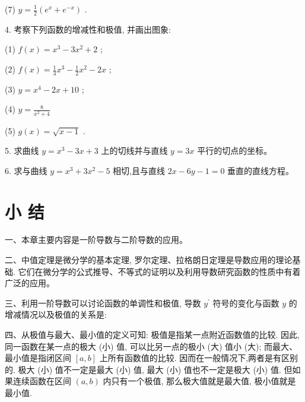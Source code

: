 \documentclass[10pt]{article}
\begin{document}
(7) \(y = \frac{1}{2}\left( {{e}^{x} + {e}^{-x}}\right)\) .

4. 考察下列函数的增减性和极值, 并画出图象:

(1) \(f\left( x\right) = {x}^{3} - 3{x}^{2} + 2\) ;

(2) \(f\left( x\right) = \frac{1}{3}{x}^{3} - \frac{1}{2}{x}^{2} - {2x}\) ;

(3) \(y = {x}^{4} - {2x} + {10}\) ;

(4) \(y = \frac{8}{{x}^{2} + 4}\)

(5) \(g\left( x\right) = \sqrt{x - 1}\) .

5. 求曲线 \(y = {x}^{3} - {3x} + 3\) 上的切线并与直线 \(y = {3x}\) 平行的切点的坐标。

6. 求与曲线 \(y = {x}^{3} + 3{x}^{2} - 5\) 相切,且与直线 \({2x} - {6y} - 1 = 0\) 垂直的直线方程。

\section*{小 结}

一、本章主要内容是一阶导数与二阶导数的应用。

二、中值定理是微分学的基本定理, 罗尔定理、拉格朗日定理是导数应用的理论基础. 它们在微分学的公式推导、不等式的证明以及利用导数研究函数的性质中有着广泛的应用。

三、利用一阶导数可以讨论函数的单调性和极值, 导数 \({y}^{\prime }\) 符号的变化与函数 \(y\) 的增减情况以及极值的关系是:

\begin{center}
\end{center}

四、从极值与最大、最小值的定义可知: 极值是指某一点附近函数值的比较. 因此, 同一函数在某一点的极大 (小) 值, 可以比另一点的极小 (大) 值小 (大); 而最大、最小值是指闭区间 \(\left\lbrack {a,b}\right\rbrack\) 上所有函数值的比较. 因而在一般情况下,两者是有区别的. 极大 (小) 值不一定是最大 (小) 值, 最大 (小) 值也不一定是极大 (小) 值. 但如果连续函数在区间 \(\left( {a,b}\right)\) 内只有一个极值, 那么极大值就是最大值, 极小值就是最小值.
\end{document}

